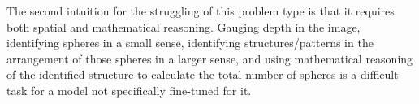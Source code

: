 \documentclass{article}
\begin{document}
	The second intuition for the struggling of this problem type is that it requires both spatial and mathematical reasoning. Gauging depth in the image, identifying spheres in a small sense, identifying structures/patterns in the arrangement of those spheres in a larger sense, and using mathematical reasoning of the identified structure to calculate the total number of spheres is a difficult task for a model not specifically fine-tuned for it.
	
	
\end{document}
